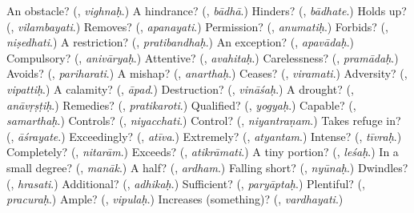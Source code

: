\begin{tcolorbox}[breakable,colback=teal!4,colframe=teal!35!black,title={Before you move on}]
An obstacle? (\textbf{}, \emph{vighnaḥ}.) A hindrance? (\textbf{}, \emph{bādhā}.) Hinders? (\textbf{}, \emph{bādhate}.) Holds up? (\textbf{}, \emph{vilambayati}.) Removes? (\textbf{}, \emph{apanayati}.) Permission? (\textbf{}, \emph{anumatiḥ}.) Forbids? (\textbf{}, \emph{niṣedhati}.) A restriction? (\textbf{}, \emph{pratibandhaḥ}.) An exception? (\textbf{}, \emph{apavādaḥ}.) Compulsory? (\textbf{}, \emph{anivāryaḥ}.) Attentive? (\textbf{}, \emph{avahitaḥ}.) Carelessness? (\textbf{}, \emph{pramādaḥ}.) Avoids? (\textbf{}, \emph{pariharati}.) A mishap? (\textbf{}, \emph{anarthaḥ}.) Ceases? (\textbf{}, \emph{viramati}.) Adversity? (\textbf{}, \emph{vipattiḥ}.) A calamity? (\textbf{}, \emph{āpad}.) Destruction? (\textbf{}, \emph{vināśaḥ}.) A drought? (\textbf{}, \emph{anāvṛṣṭiḥ}.) Remedies? (\textbf{}, \emph{pratikaroti}.) Qualified? (\textbf{}, \emph{yogyaḥ}.) Capable? (\textbf{}, \emph{samarthaḥ}.) Controls? (\textbf{}, \emph{niyacchati}.) Control? (\textbf{}, \emph{niyantraṇam}.) Takes refuge in? (\textbf{}, \emph{āśrayate}.) Exceedingly? (\textbf{}, \emph{atīva}.) Extremely? (\textbf{}, \emph{atyantam}.) Intense? (\textbf{}, \emph{tīvraḥ}.) Completely? (\textbf{}, \emph{nitarām}.) Exceeds? (\textbf{}, \emph{atikrāmati}.) A tiny portion? (\textbf{}, \emph{leśaḥ}.) In a small degree? (\textbf{}, \emph{manāk}.) A half? (\textbf{}, \emph{ardham}.) Falling short? (\textbf{}, \emph{nyūnaḥ}.) Dwindles? (\textbf{}, \emph{hrasati}.) Additional? (\textbf{}, \emph{adhikaḥ}.) Sufficient? (\textbf{}, \emph{paryāptaḥ}.) Plentiful? (\textbf{}, \emph{pracuraḥ}.) Ample? (\textbf{}, \emph{vipulaḥ}.) Increases (something)? (\textbf{}, \emph{vardhayati}.)
\end{tcolorbox}
